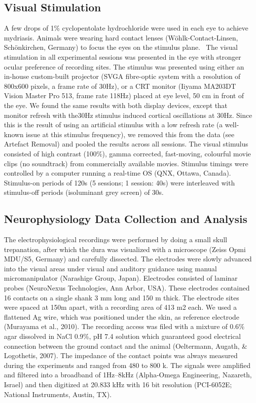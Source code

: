 \documentclass{article}
\begin{document}
\subsection{Visual Stimulation}
A few drops of 1\% cyclopentolate hydrochloride were used in each eye to achieve mydriasis. Animals were wearing hard contact lenses (W\"ohlk-Contact-Linsen, Sch\"onkirchen, Germany) to focus the eyes on the stimulus plane. \ The visual stimulation in all experimental sessions was presented in the eye with stronger ocular preference of recording sites. The stimulus was presented using either an in-house custom-built projector (SVGA fibre-optic system with a resolution of 800x600 pixels, a frame rate of 30Hz), or a CRT monitor (Iiyama MA203DT Vision Master Pro 513, frame rate 118Hz) placed at eye level, 50 cm in front of the eye. We found the same results with both display devices, except that monitor refresh with the30Hz stimulus induced cortical oscillations at 30Hz. Since this is the result of using an artificial stimulus with a low refresh rate (a well-known issue at this stimulus frequency), we removed this from the data (see Artefact Removal) and pooled the results across all sessions. The visual stimulus consisted of high contrast (100\%), gamma corrected, fast-moving, colourful movie clips (no soundtrack) from commercially available movies. Stimulus timings were controlled by a computer running a real-time OS (QNX, Ottawa, Canada). Stimulus-on periods of 120s (5 sessions; 1 session: 40s) were interleaved with stimulus-off periods (isoluminant grey screen) of 30s. 

\subsection{Neurophysiology Data Collection and Analysis}
The electrophysiological recordings were performed by doing a small skull trepanation, after which the dura was visualized with a microscope (Zeiss Opmi MDU/S5, Germany) and carefully dissected. The electrodes were slowly advanced into the visual areas under visual and auditory guidance using manual micromanipulator (Narashige Group, Japan). Electrodes consisted of laminar probes (NeuroNexus Technologies, Ann Arbor, USA). These electrodes contained 16 contacts on a single shank 3 mm long and 150 {\textmu}m thick. The electrode sites were spaced at 150{\textmu}m apart, with a recording area of 413 {\textmu}m2 each. We used a flattened Ag wire, which was positioned under the skin, as reference electrode (Murayama et al., 2010). The recording access was filed with a mixture of 0.6\% agar dissolved in NaCl 0.9\%, pH 7.4 solution which guaranteed good electrical connection between the ground contact and the animal (Oeltermann, Augath, \& Logothetis, 2007). The impedance of the contact points was always measured during the experiments and ranged from 480 to 800 k{\textohm}. The signals were amplified and filtered into a broadband of 1Hz--8kHz (Alpha-Omega Engineering, Nazareth, Israel) and then digitized at 20.833 kHz with 16 bit resolution (PCI-6052E; National Instruments, Austin, TX).
\end{document}
